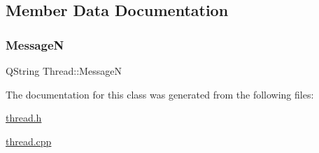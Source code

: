 \subsection{Member Data Documentation}
\mbox{\label{class_thread_a15698411cab05d061db35b2cc3e4299e}} 
\subsubsection{\texorpdfstring{MessageN}{MessageN}}
{\footnotesize\ttfamily Q\+String Thread\+::\+MessageN}



The documentation for this class was generated from the following files\+:\begin{DoxyCompactItemize}
\item 
\mbox{\hyperlink{thread_8h}{thread.\+h}}\item 
\mbox{\hyperlink{thread_8cpp}{thread.\+cpp}}\end{DoxyCompactItemize}
